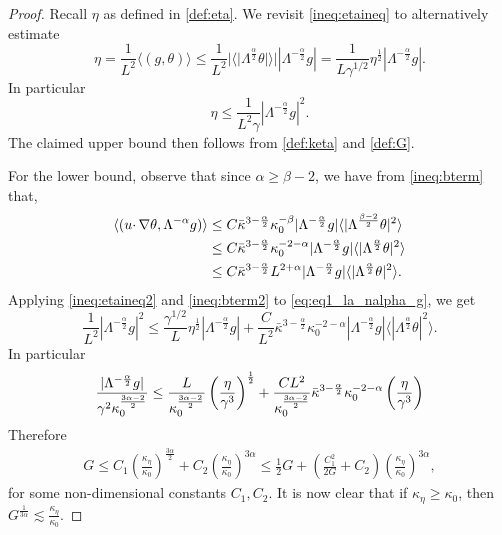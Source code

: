 \documentclass[twoside, reqno]{amsart}
\numberwithin{lemma}{section}
\numberwithin{theorem}{section}
\numberwithin{proposition}{section}
\numberwithin{equation}{section} %
\newcommand{\te}{\theta}
\newcommand{\ga}{\gamma}
\newcommand{\la}{\Lambda}
\newcommand{\ka}{\kappa}
\newcommand{\kap}{\kappa}
\begin{document}
\begin{proof}
{Recall $\eta$ as defined in \eqref{def:eta}}. We revisit \eqref{ineq:etaineq} to {alternatively estimate} 
    \begin{equation} \label{ineq:etaineq2}
        \eta = \frac{1}{L^2} \langle (g, \te) \rangle \le \frac{1}{L^2} |\langle|\la^{\frac{\alpha}{2}}\te|\rangle| |\la^{-\frac{\alpha}{2}}g| 
        = \frac{1}{L\ga^{1/2}} \eta^{\frac{1}{2}} |\la^{-\frac{\alpha}{2}}g| .
    \end{equation}
{In particular}
     \begin{equation} \label{ineq:etahalf}
        \eta \le \frac{1}{L^2 \ga} |\la^{-\frac{\alpha}{2}}g|^2.
    \end{equation}
{The claimed upper bound then follows from \eqref{def:keta} and \eqref{def:G}.}
    
{For the lower bound, observe that since $\alpha \ge \beta-2$, we} have from \eqref{ineq:bterm} {that}, 
    \begin{align} \label{ineq:bterm2}
    \langle (u \cdotp\nabla \te, \la^{-\alpha}g) \rangle  & \le C \bar{\ka}^{3-\frac{\alpha}{2}}\ka_0^{-\beta} |\la^{-\frac{\alpha}{2}}g| \langle |\la^{\frac{\beta-2}{2}}\te|^2 \rangle \notag
    \\
    & \le C \bar{\ka}^{3-\frac{\alpha}{2}} \ka_0^{-2-\alpha} |\la^{-\frac{\alpha}{2}}g| \langle |\la^{\frac{\alpha}{2}}\te|^2 \rangle \notag
    \\
    &\leq C \bar{\ka}^{3-\frac{\alpha}{2}} L^{2+\alpha} |\la^{-\frac{\alpha}{2}}g| \langle |\la^{\frac{\alpha}{2}}\te|^2 \rangle.   
    \end{align}   
Applying \eqref{ineq:etaineq2} and \eqref{ineq:bterm2} to \eqref{eq:eq1_la_nalpha_g}, we get
    \begin{equation*} 
         \frac{1}{L^2} |\la^{-\frac{\alpha}{2}} g|^2 \le \frac{\ga^{1/2}}{L} \eta^{\frac{1}{2}} |\la^{-\frac{\alpha}{2}}g| + \frac{C}{L^2} \bar{\ka}^{3-\frac{\alpha}{2}} \ka_0^{-2-\alpha} |\la^{-\frac{\alpha}{2}}g| \langle |\la^{\frac{\alpha}{2}}\te|^2 \rangle.
    \end{equation*}
In particular
    \begin{align}\notag
        \frac{|\la^{-\frac{\alpha}{2}}g|}{\ga^2 \kappa_0^{\frac{3\alpha-2}{2}}} \le \frac{L}{\kappa_0^{\frac{3\alpha-2}{2}}} \left(\frac{\eta}{\ga^3}\right)^{\frac{1}{2}} + \frac{CL^2}{\kappa_0^{\frac{3\alpha-2}{2}}}\bar{\ka}^{3-\frac{\alpha}{2}} \ka_0^{-2-\alpha}\left(\frac{\eta}{\ga^3}\right)
    \end{align}
Therefore
    \begin{align}\label{ineq:g3}
        G \le C_1 \left(\frac{\ka_\eta}{\ka_0}\right)^{\frac{3\alpha}{2}} + C_2 \left(\frac{\ka_\eta}{\ka_0}\right)^{3\alpha}\leq \frac{1}2G+\left(\frac{C_1^2}{2G}+C_2\right)\left(\frac{\ka_\eta}{\ka_0}\right)^{3\alpha},
    \end{align}
{for some non-dimensional constants $C_1, C_2$. It is now clear that if $\kap_\eta\geq\kap_0$, then $G^{\frac{1}{3\alpha}} \lesssim \frac{\ka_\eta}{\ka_0}$.}  
\end{proof}
\end{document}
